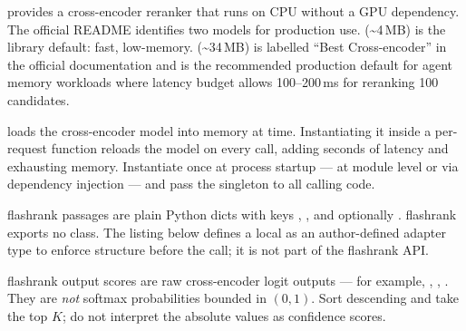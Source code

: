  provides a cross-encoder reranker that runs on CPU without
a GPU dependency. The official README identifies two models for production
use.  (\textasciitilde{}4\,MB) is the library
default: fast, low-memory. 
(\textasciitilde{}34\,MB) is labelled ``Best Cross-encoder'' in the
official documentation and is the recommended production default for agent
memory workloads where latency budget allows 100--200\,ms for reranking 100
candidates.

\begin{warningbox}
 loads the cross-encoder model into memory at
 time. Instantiating it inside a per-request function
reloads the model on every call, adding seconds of latency and exhausting
memory. Instantiate  once at process startup --- at module
level or via dependency injection --- and pass the singleton to all
calling code.
\end{warningbox}

flashrank passages are plain Python dicts with keys , ,
and optionally . flashrank exports no  class.
The listing below defines a local  
as an author-defined adapter type to enforce structure before the
 call; it is not part of the flashrank API.

\begin{notebox}
flashrank  output scores are raw cross-encoder logit
outputs --- for example, , , .
They are \emph{not} softmax probabilities bounded in $(0, 1)$. Sort
descending and take the top $K$; do not interpret the absolute values as
confidence scores.
\end{notebox}

